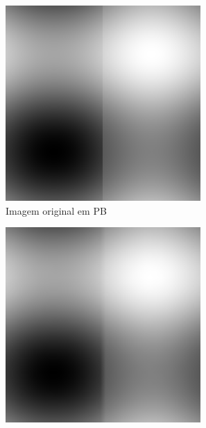 \documentclass[12pt, a4paper]{article}
\begin{document}
    \begin{figure}[h]
        \begin{subfigure}{.3\textwidth}
            \includegraphics[width=.95\textwidth]{../trdFunBW.png}
            \caption{Imagem original em PB}
        \end{subfigure}
        \begin{subfigure}{.3\textwidth}
            \includegraphics[width=.95\textwidth]{../trdFunBWBL.png}

\end{subfigure}
\end{figure}
\end{document}
